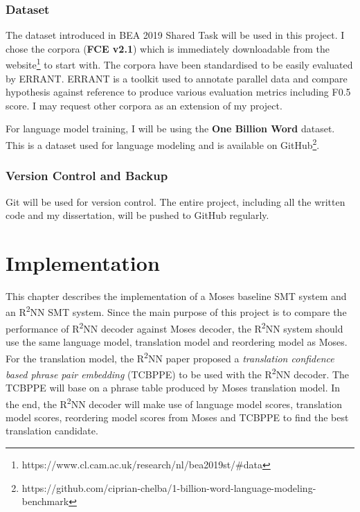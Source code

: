 \documentclass[12pt,a4paper,twoside,openright]{report}
\begin{document}
\subsection{Dataset}
The dataset introduced in BEA 2019 Shared Task\cite{bryant-etal-2019-bea} will be used in this project. I chose the corpora (\textbf{FCE v2.1}) which is immediately downloadable from the website\footnote{https://www.cl.cam.ac.uk/research/nl/bea2019st/\#data} to start with. The corpora have been standardised to be easily evaluated by ERRANT\cite{bryant-etal-2017-automatic}\cite{felice-etal-2016-automatic}. ERRANT is a toolkit used to annotate parallel data and compare hypothesis against reference to produce various evaluation metrics including F0.5 score. I may request other corpora as an extension of my project.

For language model training, I will be using the \textbf{One Billion Word} dataset\cite{one-billion-word}. This is a dataset used for language modeling and is available on GitHub\footnote{https://github.com/ciprian-chelba/1-billion-word-language-modeling-benchmark}.

\subsection{Version Control and Backup}
Git will be used for version control. The entire project, including all the written code and my dissertation, will be pushed to GitHub regularly.


\chapter{Implementation}
This chapter describes the implementation of a Moses baseline SMT system and an R\textsuperscript{2}NN SMT system. Since the main purpose of this project is to compare the performance of R\textsuperscript{2}NN decoder against Moses decoder, the R\textsuperscript{2}NN system should use the same language model, translation model and reordering model as Moses. For the translation model, the R\textsuperscript{2}NN paper\cite{r2nn} proposed a \textit{translation confidence based phrase pair embedding} (TCBPPE) to be used with the R\textsuperscript{2}NN decoder. The TCBPPE will base on a phrase table produced by Moses translation model. In the end, the R\textsuperscript{2}NN decoder will make use of language model scores, translation model scores, reordering model scores from Moses and TCBPPE to find the best translation candidate.
\end{document}
